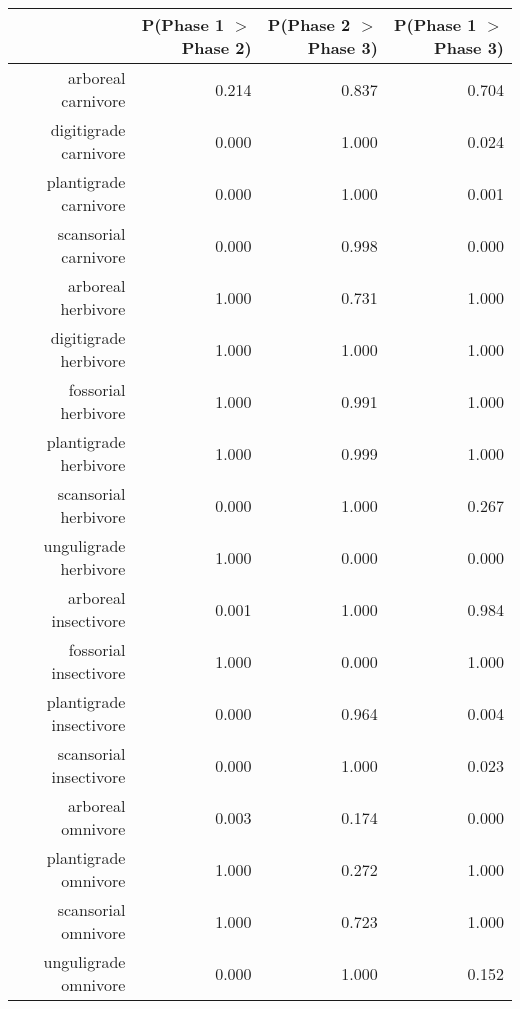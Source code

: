 \begin{table}[ht]
\centering
\begin{tabular}{rrrr}
  \hline
 & P(Phase 1 $>$ Phase 2) & P(Phase 2 $>$ Phase 3) & P(Phase 1 $>$ Phase 3) \\ 
  \hline
arboreal carnivore & 0.214 & 0.837 & 0.704 \\ 
  digitigrade carnivore & 0.000 & 1.000 & 0.024 \\ 
  plantigrade carnivore & 0.000 & 1.000 & 0.001 \\ 
  scansorial carnivore & 0.000 & 0.998 & 0.000 \\ 
  arboreal herbivore & 1.000 & 0.731 & 1.000 \\ 
  digitigrade herbivore & 1.000 & 1.000 & 1.000 \\ 
  fossorial herbivore & 1.000 & 0.991 & 1.000 \\ 
  plantigrade herbivore & 1.000 & 0.999 & 1.000 \\ 
  scansorial herbivore & 0.000 & 1.000 & 0.267 \\ 
  unguligrade herbivore & 1.000 & 0.000 & 0.000 \\ 
  arboreal insectivore & 0.001 & 1.000 & 0.984 \\ 
  fossorial insectivore & 1.000 & 0.000 & 1.000 \\ 
  plantigrade insectivore & 0.000 & 0.964 & 0.004 \\ 
  scansorial insectivore & 0.000 & 1.000 & 0.023 \\ 
  arboreal omnivore & 0.003 & 0.174 & 0.000 \\ 
  plantigrade omnivore & 1.000 & 0.272 & 1.000 \\ 
  scansorial omnivore & 1.000 & 0.723 & 1.000 \\ 
  unguligrade omnivore & 0.000 & 1.000 & 0.152 \\ 
   \hline
\end{tabular}
\label{tab:occur_plant}
\end{table}

